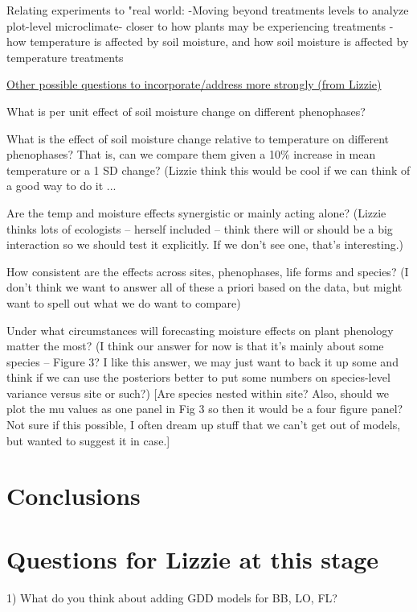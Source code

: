 \documentclass{article}
\begin{document}
\par Relating experiments to "real world:
    -Moving beyond treatments levels to analyze plot-level microclimate- closer to how plants may be experiencing treatments
    -how temperature is affected by soil moisture, and how soil moisture is affected by temperature treatments
\par \underline{Other possible questions to incorporate/address more strongly (from Lizzie)}
\par What is per unit effect of soil moisture change on different phenophases? 
\par What is the effect of soil moisture change relative to temperature on different phenophases? That is, can we compare them given a 10\% increase in mean temperature or a 1 SD change? (Lizzie think this would be cool if we can think of a good way to do it ... 
\par Are the temp and moisture effects synergistic or mainly acting alone? (Lizzie thinks lots of ecologists -- herself included -- think there will or should be a big interaction so we should test it explicitly. If we don't see one, that's interesting.)
\par How consistent are the effects across sites, phenophases, life forms and species? (I don't think we want to answer all of these a priori based on the data, but might want to spell out what we do want to compare)
\par Under what circumstances will forecasting moisture effects on plant phenology matter the most? (I think our answer for now is that it's mainly about some species -- Figure 3? I like this answer, we may just want to back it up some and think if we can use the posteriors better to put some numbers on species-level variance versus site or such?) [Are species nested within site? Also, should we plot the mu values as one panel in Fig 3 so then it would be a four figure panel? Not sure if this possible, I often dream up stuff that we can't get out of models, but wanted to suggest it in case.]


\section* {Conclusions}

\section* {Questions for Lizzie at this stage}

1) What do you think about adding GDD models for BB, LO, FL?
\end{document}
